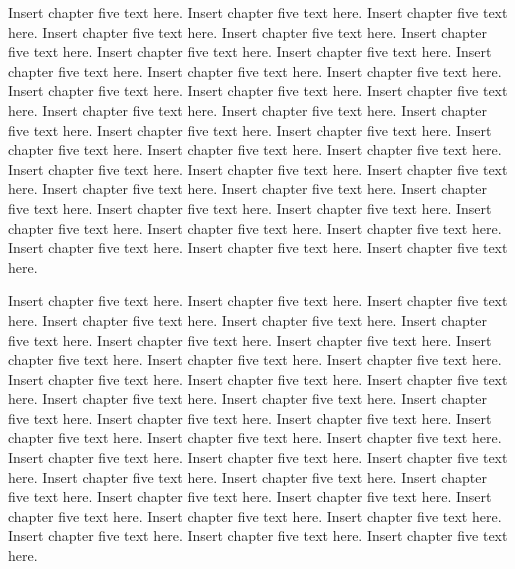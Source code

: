 Insert chapter five text here. Insert chapter five text here. Insert chapter five text here. Insert chapter five text here. Insert chapter five text here. Insert chapter five text here. Insert chapter five text here. Insert chapter five text here. Insert chapter five text here. Insert chapter five text here. Insert chapter five text here. Insert chapter five text here. Insert chapter five text here. Insert chapter five text here. Insert chapter five text here. Insert chapter five text here. Insert chapter five text here. Insert chapter five text here. Insert chapter five text here. Insert chapter five text here. Insert chapter five text here. Insert chapter five text here. Insert chapter five text here. Insert chapter five text here. Insert chapter five text here. Insert chapter five text here. Insert chapter five text here. Insert chapter five text here. Insert chapter five text here. Insert chapter five text here. Insert chapter five text here. Insert chapter five text here. Insert chapter five text here. Insert chapter five text here. Insert chapter five text here. Insert chapter five text here.

Insert chapter five text here. Insert chapter five text here. Insert chapter five text here. Insert chapter five text here. Insert chapter five text here. Insert chapter five text here. Insert chapter five text here. Insert chapter five text here. Insert chapter five text here. Insert chapter five text here. Insert chapter five text here. Insert chapter five text here. Insert chapter five text here. Insert chapter five text here. Insert chapter five text here. Insert chapter five text here. Insert chapter five text here. Insert chapter five text here. Insert chapter five text here. Insert chapter five text here. Insert chapter five text here. Insert chapter five text here. Insert chapter five text here. Insert chapter five text here. Insert chapter five text here. Insert chapter five text here. Insert chapter five text here. Insert chapter five text here. Insert chapter five text here. Insert chapter five text here. Insert chapter five text here. Insert chapter five text here. Insert chapter five text here. Insert chapter five text here. Insert chapter five text here. Insert chapter five text here.

